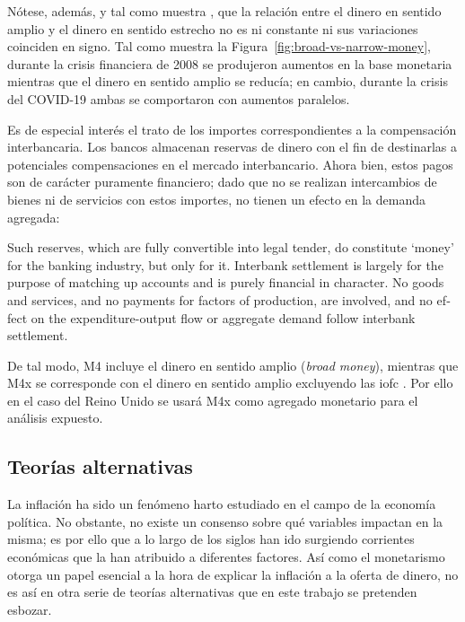 \documentclass[titlepage, 12pt]{article}
\begin{document}
Nótese, además, y tal como muestra \cite[76]{bordo2021}, que la relación entre el dinero en sentido amplio y el dinero en sentido estrecho no es ni constante ni sus variaciones coinciden en signo. Tal como muestra la Figura~\ref{fig:broad-vs-narrow-money}, durante la crisis financiera de 2008 se produjeron aumentos en la base monetaria mientras que el dinero en sentido amplio se reducía; en cambio, durante la crisis del COVID-19 ambas se comportaron con aumentos paralelos.

Es de especial interés el trato de los importes correspondientes a la compensación interbancaria. Los bancos almacenan reservas de dinero con el fin de destinarlas a potenciales compensaciones en el mercado interbancario. Ahora bien, estos pagos son de carácter puramente financiero; dado que no se realizan intercambios de bienes ni de servicios con estos importes, no tienen un efecto en la demanda agregada:

\begin{displayquote}
    \begin{otherlanguage}{english}
        Such reserves, which are fully convertible into legal tender, do constitute ‘money’ for the banking industry, but only for it. Interbank settlement is largely for the purpose of matching up accounts and is purely financial in character. No goods and services, and no payments for factors of production, are involved, and no effect on the expenditure-output flow or aggregate demand follow interbank settlement. \autocite[41]{congdon2024}
    \end{otherlanguage}
\end{displayquote}

De tal modo, M4 incluye el dinero en sentido amplio (\textit{broad money}), mientras que M4x se corresponde con el dinero en sentido amplio excluyendo las \acrfull{iofc} \autocite[41]{congdon2024}. Por ello en el caso del Reino Unido se usará M4x como agregado monetario para el análisis expuesto.

\subsection{Teorías alternativas}

La inflación ha sido un fenómeno harto estudiado en el campo de la economía política. No obstante, no existe un consenso sobre qué variables impactan en la misma; es por ello que a lo largo de los siglos han ido surgiendo corrientes económicas que la han atribuido a diferentes factores. Así como el monetarismo otorga un papel esencial a la hora de explicar la inflación a la oferta de dinero, no es así en otra serie de teorías alternativas que en este trabajo se pretenden esbozar.
\end{document}
